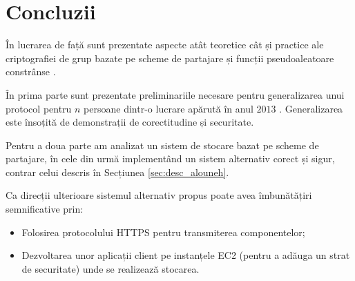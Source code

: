 \documentclass[oneside, 12pt]{book}
\begin{document}
\chapter{Concluzii}

În lucrarea de față sunt prezentate aspecte atât teoretice cât și practice ale criptografiei de grup bazate pe scheme de partajare și funcții pseudoaleatoare constrânse \cite{S:1979, boneh:2013constrained}.

În prima parte sunt prezentate preliminariile necesare pentru generalizarea unui protocol pentru $n$ persoane dintr-o lucrare apărută în anul $2013$ \cite{boneh:2013constrained}. Generalizarea este însoțită de demonstrații de corectitudine și securitate.

Pentru a doua parte am analizat un sistem de stocare bazat pe scheme de partajare, în cele din urmă implementând un sistem alternativ corect și sigur, contrar celui descris în Secțiunea \ref{sec:desc_alouneh}.

Ca direcții ulterioare sistemul alternativ propus poate avea îmbunătățiri semnificative prin:

\begin{itemize}
	\item Folosirea protocolului HTTPS pentru transmiterea componentelor;
	\item Dezvoltarea unor aplicații client pe instanțele EC2 (pentru a adăuga un strat de securitate) unde se realizează stocarea.
\end{itemize}


\clearpage



\end{document}
